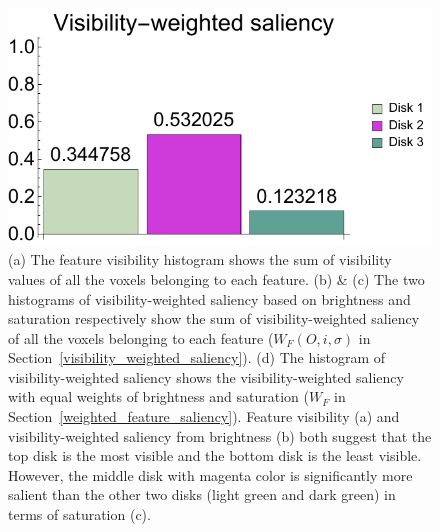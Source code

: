 \begin{figure}
\begin{minipage}{.45\textwidth}
		\subcaption{}
	\end{minipage}~
	\begin{minipage}{.45\textwidth}
		\includegraphics[width=1\linewidth]{figures/disk_visibility_saliency_weighted_chart_left}
		\subcaption{}
	\end{minipage}
	\caption[The feature visibility histogram and the visiblity-weighted saliency histograms from the left viewpoint]{(a) The feature visibility \cite{wang_efficient_2011} histogram shows the sum of visibility values of all the voxels belonging to each feature.
		(b) \& (c) The two histograms of visibility-weighted saliency based on brightness and saturation respectively show the sum of visibility-weighted saliency of all the voxels belonging to each feature ($ W_{F}(O,i,\sigma) $ in Section~\ref{visibility_weighted_saliency}).
		(d) The histogram of visibility-weighted saliency shows the visibility-weighted saliency with equal weights of brightness and saturation ($ W_{F} $ in Section~\ref{weighted_feature_saliency}).
		Feature visibility (a) and visibility-weighted saliency from brightness (b) both suggest that the top disk is the most visible and the bottom disk is the least visible.
		However, the middle disk with magenta color is significantly more salient than the other two disks (light green and dark green) in terms of saturation (c).
	}
	\label{fig:disks_saliency_chart_left}
\end{figure}


